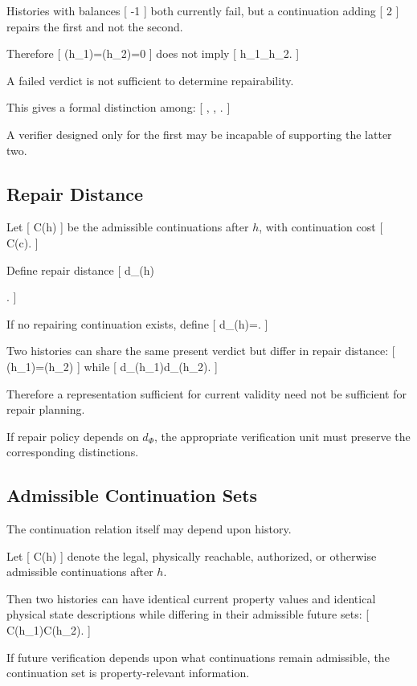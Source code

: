 \documentclass[11pt]{article}
\begin{document}
Histories with balances
[
-1
\qquad{}
]
both currently fail, but a continuation adding
[
2
]
repairs the first and not the second.

Therefore
[
\Phi(h_1)=\Phi(h_2)=0
]
does not imply
[
h_1\equiv_\Phi h_2.
]

A failed verdict is not sufficient to determine repairability.

This gives a formal distinction among:
[
,
\qquad
{},
\qquad
{}.
]

A verifier designed only for the first may be incapable of supporting the latter two.

\subsection{Repair Distance}

Let
[
\mathcal C(h)
]
be the admissible continuations after $h$, with continuation cost
[
C(c).
]

Define repair distance
[
d_\Phi(h)

\inf
{}.
]

If no repairing continuation exists, define
[
d_\Phi(h)=\infty.
]

Two histories can share the same present verdict but differ in repair distance:
[
\Phi(h_1)=\Phi(h_2)
]
while
[
d_\Phi(h_1)\neq d_\Phi(h_2).
]

Therefore a representation sufficient for current validity need not be sufficient for repair planning.

If repair policy depends on $d_\Phi$, the appropriate verification unit must preserve the corresponding distinctions.

\subsection{Admissible Continuation Sets}

The continuation relation itself may depend upon history.

Let
[
\mathcal C(h)
]
denote the legal, physically reachable, authorized, or otherwise admissible continuations after $h$.

Then two histories can have identical current property values and identical physical state descriptions while differing in their admissible future sets:
[
\mathcal C(h_1)\neq\mathcal C(h_2).
]

If future verification depends upon what continuations remain admissible, the continuation set is property-relevant information.
\end{document}
